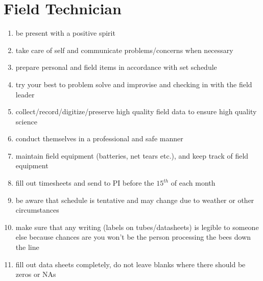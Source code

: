 \documentclass[12pt]{article}
\begin{document}
\section{Field Technician}
\begin{enumerate}
\item be present with a positive spirit
\item take care of self and communicate problems/concerns when
  necessary
\item prepare personal and field items in accordance with set schedule
\item try your best to problem solve and improvise and checking in
  with the field leader
\item collect/record/digitize/preserve high quality field data to
  ensure high quality science
\item conduct themselves in a professional and safe manner
\item maintain field equipment (batteries, net tears etc.), and keep
  track of field equipment
\item fill out timesheets and send to PI before the $15^{th}$ of each month
\item be aware that schedule is tentative and may change due to weather or other circumstances 
\item make sure that any writing (labels on tubes/datasheets) is legible to someone else because chances are you won't be the person processing the bees down the line 
\item fill out data sheets completely, do not leave blanks where there should be zeros or NAs
\end{enumerate}
\end{document}
